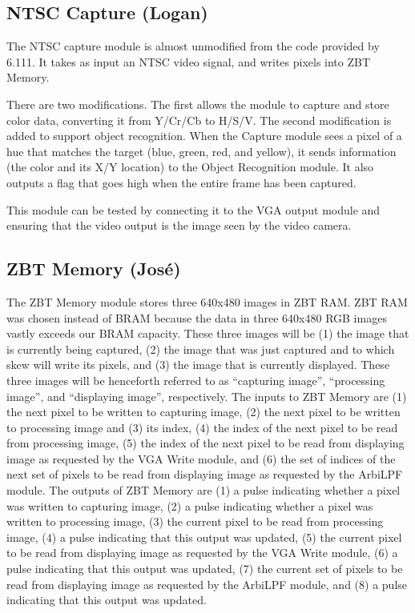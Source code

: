\documentclass[10pt]{article}
\begin{document}
\subsection{NTSC Capture (Logan)}
The NTSC capture module is almost unmodified from the code provided by 6.111. It takes as input an NTSC video signal, and writes pixels into ZBT Memory.

There are two modifications. The first allows the module to capture and store color data, converting it from Y/Cr/Cb to H/S/V. The second modification is added to support object recognition. When the Capture module sees a pixel of a hue that matches the target (blue, green, red, and yellow), it sends information (the color and its X/Y location) to the Object Recognition module. It also outputs a flag that goes high when the entire frame has been captured.

This module can be tested by connecting it to the VGA output module and ensuring that the video output is the image seen by the video camera.

\subsection{ZBT Memory (Jos\'{e})}
The ZBT Memory module stores three 640x480 images in ZBT RAM. ZBT RAM was chosen instead of BRAM because the data in three 640x480 RGB images vastly exceeds our BRAM capacity. These three images will be (1) the image that is currently being captured, (2) the image that was just captured and to which skew will write its pixels, and (3) the image that is currently displayed. These three images will be henceforth referred to as ``capturing image'', ``processing image'', and ``displaying image'', respectively. The inputs to ZBT Memory are (1) the next pixel to be written to capturing image, (2) the next pixel to be written to processing image and (3) its index, (4) the index of the next pixel to be read from processing image, (5) the index of the next pixel to be read from displaying image as requested by the VGA Write module, and (6) the set of indices of the next set of pixels to be read from displaying image as requested by the ArbiLPF module. The outputs of ZBT Memory are (1) a pulse indicating whether a pixel was written to capturing image, (2) a pulse indicating whether a pixel was written to processing image, (3) the current pixel to be read from processing image, (4) a pulse indicating that this output was updated, (5) the current pixel to be read from displaying image as requested by the VGA Write module, (6) a pulse indicating that this output was updated, (7) the current set of pixels to be read from displaying image as requested by the ArbiLPF module, and (8) a pulse indicating that this output was updated.
\end{document}
